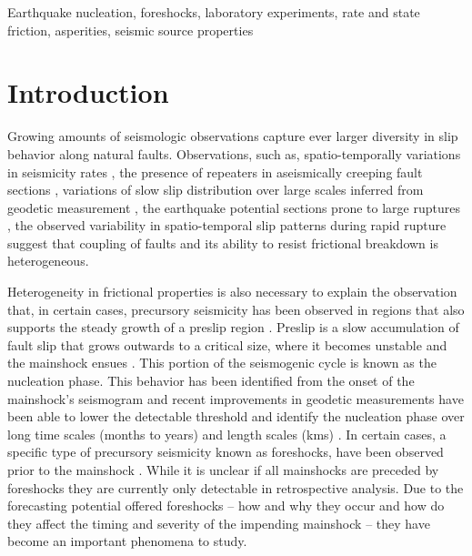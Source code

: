 \documentclass[preprint,1p, 10pt,authoryear]{elsarticle}
\begin{document}
\begin{frontmatter}
\begin{keyword}
Earthquake nucleation, foreshocks, laboratory experiments, rate and state friction, asperities, seismic source properties
\end{keyword}

\end{frontmatter}
\doublespacing
\linenumbers



\section{Introduction}
\label{int}
Growing amounts of seismologic observations capture ever larger diversity in slip behavior along natural faults. Observations, such as, spatio-temporally variations in seismicity rates \citep{Tormann2014, Tormann2015, Gulia2016, Guila2019}, the presence of repeaters in aseismically creeping fault sections \citep[e.g.][]{Nadeau1994, McEvilly1999, Shirezaei2013, Uchida2019}, variations of slow slip distribution over large scales inferred from geodetic measurement  \citep[e.g.][]{Brodsky2014, Ruiz2014, Socquet2017}, the earthquake potential sections prone to large ruptures \citep{Burgmann2000, Burgmann2014}, the observed variability in spatio-temporal slip patterns during rapid rupture \citep[e.g.][]{Mai2002, Tinti2005, Dreger2007, Galvez2016, Mai2017} suggest that coupling of faults and its ability to resist frictional breakdown is heterogeneous. 

Heterogeneity in frictional properties is also necessary to explain the observation that, in certain cases, precursory seismicity has been observed in regions that also supports the steady growth of a preslip region \citep{Kato2012, Kato2016, Obara2016, Ruiz2014, Bouchon2013, Burgmann2014}. Preslip is a slow accumulation of fault slip that grows outwards to a critical size, where it becomes unstable and the mainshock ensues \citep{Ohnaka1992, Ben-Zion2010}. This portion of the seismogenic cycle is known as the nucleation phase. This behavior has been identified from the onset of the mainshock's seismogram \citep{Iio1995, Ellsworth1995, Beroza1996} and recent improvements in geodetic measurements have been able to lower the detectable threshold and identify the nucleation phase over long time scales (months to years) and length scales (kms) \citep[e.g.,][]{ Ruiz2014, Socquet2017}.  In certain cases, a specific type of precursory seismicity known as foreshocks, have been observed prior to the mainshock \citep{Dodge1995, Dodge1996, Bouchon2011}. While it is unclear if all mainshocks are preceded by foreshocks \citep{Brodsky2014, Mignan2014, Seif2018} they are currently only detectable in retrospective analysis. Due to the forecasting potential offered foreshocks -- how and why they occur and how do they affect the timing and severity of the impending mainshock -- they have become an important phenomena to study.
\end{document}
